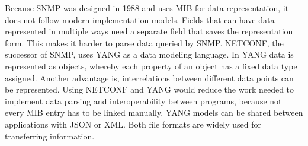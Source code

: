 Because SNMP was designed in 1988 and uses MIB for data representation, it does not follow modern implementation models. Fields that can have data represented in multiple ways need a separate field that saves the representation form. This makes it harder to parse data queried by SNMP. NETCONF, the successor of SNMP, uses YANG as a data modeling language. In YANG data is represented as objects, whereby each property of an object has a fixed data type assigned. Another advantage is, interrelations between different data points can be represented. Using NETCONF and YANG would reduce the work needed to implement data parsing and interoperability between programs, because not every MIB entry has to be linked manually. YANG models can be shared between applications with JSON or XML. Both file formats are widely used for transferring information.
